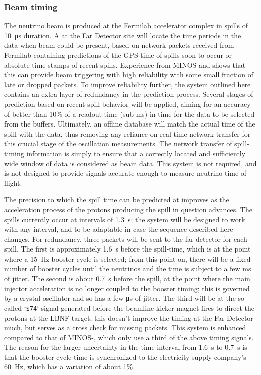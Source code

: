 

\subsubsection{Beam timing}
\label{sec:fd-daq-design-beamtiming}

The neutrino beam is produced at the Fermilab accelerator complex in
spills of \SI{10}{\us} duration. 
A  at the Far Detector site will locate the time periods in
the data when beam could be present, based on network packets received
from Fermilab containing predictions of the GPS-time of spills soon to
occur or absolute time stamps of recent spills. %
Experience from MINOS and \nova shows that this can provide beam
triggering with high reliability with some small fraction of late or
dropped packets.
To improve reliability further, the system outlined here contains an extra layer
of redundancy in the prediction process. 
Several stages of prediction based on recent spill behavior will be applied, aiming
for an accuracy of better than 10\% of a readout
time (sub-\si{\ms}) in time for the data to be selected from
the  buffers. 
Ultimately, an offline database will match the actual time of the
spill with the data, thus removing any reliance on real-time network
transfer for this crucial stage of the oscillation measurements. The
network transfer of spill-timing information is simply to ensure that a
correctly located and sufficiently wide window of data is considered
as beam data. This system is not required, and is not designed to
provide signals accurate enough to measure neutrino time-of-flight.

The precision to which the spill time can be predicted at \fnal
improves as the acceleration process of the protons producing the
spill in question advances.  The spills currently occur at intervals
of \SI{1.3}{\s}; the system will be designed to work with any interval, and
to be adaptable in case the sequence described here changes.  For
redundancy, three packets will be sent to the far detector for each
spill.  The first is approximately \SI{1.6}{\s} before the spill-time, which
is at the point where a \SI{15}{\Hz} booster cycle is selected; from this
point on, there will be a fixed number of booster cycles until the
neutrinos and the time is subject to a few \si{\ms} of jitter.  The second
is about \SI{0.7}{\s} before the spill, at the point where the main injector
acceleration is no longer coupled to the booster timing; this is
governed by a crystal oscillator and so has a few \si{\us} of jitter.
The third will be at the so called `\texttt{\$74}' signal generated before the beamline kicker magnet fires
to direct the protons at the LBNF target; this doesn't improve the
timing at the Far Detector much, but serves as a cross check for
missing packets.  This system is enhanced compared to that of
MINOS-\nova, which only use a third of the above timing signals.  The
reason for the larger uncertainty in the time interval from \SI{1.6}{\s} to
\SI{0.7}{\s} is that the booster cycle time is synchronized to the
electricity supply company's \SI{60}{\Hz}, which has a variation of about
1\%.

